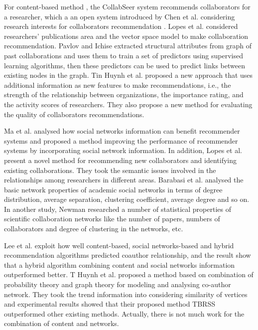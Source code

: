 \documentclass{acm_proc_article-sp}
\begin{document}
For content-based method \cite{balog2007finding} \cite{gollapalli2012similar}, the CollabSeer system recommends collaborators for a researcher, which a an open system introduced by Chen et al. considering research interests for collaborators recommendation \cite{chen2011collabseer}. Lopes et al. \cite{lopes2010collaboration} considered researchers' publications area and the vector space model to make collaboration recommendation. Pavlov and Ichise \cite{pavlov2007finding} extracted structural attributes from graph of past collaborations and uses them to train a set of predictors using supervised learning algorithms, then these predictors can be used to predict links between existing nodes in the graph. Tin Huynh et al. \cite{huynh2013trend} proposed a new approach that uses additional information as new features to make recommendations, i.e., the strength of the relationship between organizations, the importance rating, and the activity scores of researchers. They also propose a new method for evaluating the quality of collaborators recommendations.

Ma et al. \cite{ma2011recommender} analysed how social networks information can benefit recommender systems and proposed a method improving the performance of recommender systems by incorporating social network information. In addition, Lopes et al. \cite{lopes2010collaboration} present a novel method for recommending new collaborators and identifying existing collaborations. They took the semantic issues involved in the relationships among researchers in different areas. Barabasi et al. \cite{barabasi2002evolution} analysed the basic network properties of academic social networks in terms of degree distribution, average separation, clustering coefficient, average degree and so on. In another study, Newman researched a number of statistical properties of scientific collaboration networks like the number of papers, numbers of collaborators and degree of clustering in the networks, etc.

Lee et al. \cite{lee2011recommending} exploit how well content-based, social networks-based and hybrid recommendation algorithms predicted coauthor relationship, and the result show that a hybrid algorithm combining content and social networks information outperformed better. T Huynh et al. \cite{huynh2013trend} proposed a method based on combination of probability theory and graph theory for modeling and analysing co-author network. They took the trend information into considering similarity of vertices and experimental results showed that their proposed method TBRSS outperformed other existing methods. Actually, there is not much work for the combination of content and networks.
\end{document}
